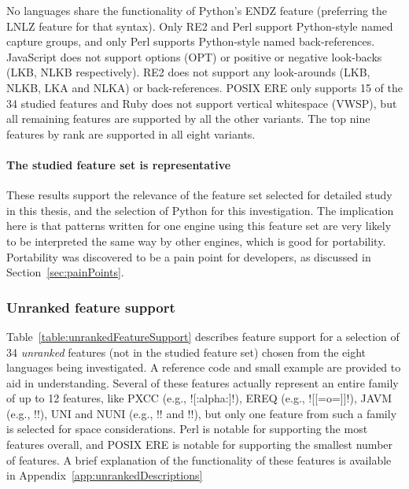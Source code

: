 No languages share the functionality of Python's ENDZ feature (preferring the LNLZ feature for that syntax).  Only RE2 and Perl support Python-style named capture groups, and only Perl supports Python-style named back-references.  JavaScript does not support options (OPT) or positive or negative look-backs (LKB, NLKB respectively).  RE2 does not support any look-arounds (LKB, NLKB, LKA and NLKA) or back-references.  POSIX ERE only supports 15 of the 34 studied features and Ruby does not support vertical whitespace (VWSP), but all remaining features are supported by all the other variants.  The top nine features by rank are supported in all eight variants.

\paragraph{The studied feature set is representative}  These results support the relevance of the feature set selected for detailed study in this thesis, and the selection of Python for this investigation.  The implication here is that patterns written for one engine using this feature set are very likely to be interpreted the same way by other engines, which is good for portability.  Portability was discovered to be a pain point for developers, as discussed in Section~\ref{sec:painPoints}.

\afterpage{\clearpage}



\subsubsection{Unranked feature support}
Table~\ref{table:unrankedFeatureSupport} describes feature support for a selection of 34 \emph{unranked} features (not in the studied feature set) chosen from the eight languages being investigated.  A reference code and small example are provided to aid in understanding.  Several of these features actually represent an entire family of up to 12 features, like PXCC (e.g., \cverb![:alpha:]!), EREQ (e.g., \cverb![[=o=]]!), JAVM (e.g., \cverb!!), UNI and NUNI (e.g., \cverb!\pL! and \cverb!\PM!), but only one feature from such a family is selected for space considerations.  Perl is notable for supporting the most features overall, and POSIX ERE is notable for supporting the smallest number of features.  A brief explanation of the functionality of these features is available in Appendix~\ref{app:unrankedDescriptions}

